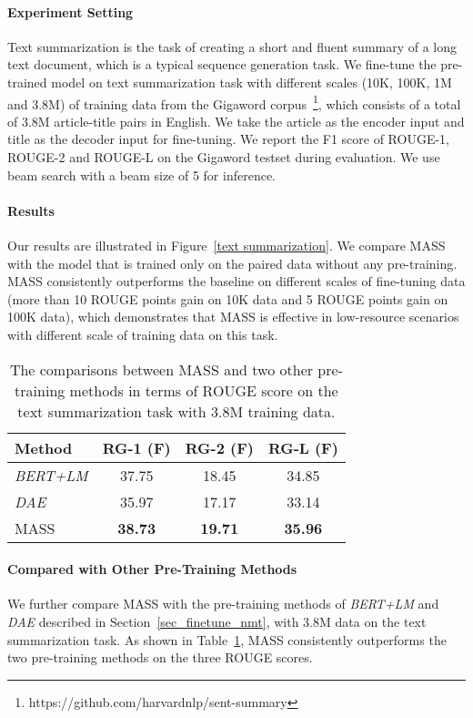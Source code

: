 \documentclass{article}
\begin{document}
	\paragraph{Experiment Setting} Text summarization is the task of creating a short and fluent summary of a long text document, which is a typical sequence generation task. We fine-tune the pre-trained model on text summarization task with different scales (10K, 100K, 1M and 3.8M) of training data from the Gigaword corpus~\cite{Graff03Eg}\footnote{https://github.com/harvardnlp/sent-summary}, which consists of a total of 3.8M article-title pairs in English. We take the article as the encoder input and title as the decoder input for fine-tuning. We report the F1 score of ROUGE-1, ROUGE-2 and ROUGE-L on the Gigaword testset during evaluation. We use beam search with a beam size of 5 for inference.
	
	\paragraph{Results} Our results are illustrated in Figure~\ref{text summarization}. We compare MASS with the model that is trained only on the paired data without any pre-training. MASS consistently outperforms the baseline on different scales of fine-tuning data (more than 10 ROUGE points gain on 10K data and 5 ROUGE points gain on 100K data), which demonstrates that MASS is effective in low-resource scenarios with different scale of training data on this task.
	
	\begin{table}[h]
		\small
		\centering
		\begin{tabular}{l|c c c }
			\toprule
			Method & RG-1 (F) & RG-2 (F) & RG-L (F) \\
			\midrule
			\textit{BERT+LM}   & 37.75 & 18.45 & 34.85 \\
			\textit{DAE}       & 35.97 & 17.17 & 33.14 \\
			\midrule
			MASS               & \textbf{38.73} & \textbf{19.71} & \textbf{35.96} \\
			\bottomrule
		\end{tabular}
		\caption{The comparisons between MASS and two other pre-training methods in terms of ROUGE score on the text summarization task with 3.8M training data.}
		\label{tab_pretraining_compare_text}
	\end{table}
	
	\paragraph{Compared with Other Pre-Training Methods}
	We further compare MASS with the pre-training methods of \textit{BERT+LM} and \textit{DAE} described in Section~\ref{sec_finetune_nmt}, with 3.8M data on the text summarization task. As shown in Table~\ref{tab_pretraining_compare_text}, MASS consistently outperforms the two pre-training methods on the three ROUGE scores.
	
\end{document}
